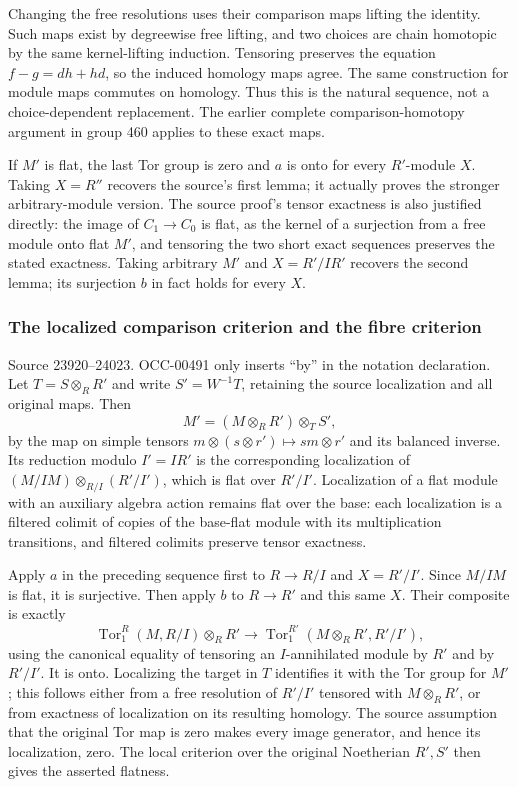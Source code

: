 Changing the free resolutions uses their comparison maps lifting the identity. Such maps exist by degreewise free lifting, and two choices are chain homotopic by the same kernel-lifting induction. Tensoring preserves the equation \(f-g=dh+hd\), so the induced homology maps agree. The same construction for module maps commutes on homology. Thus this is the natural sequence, not a choice-dependent replacement. The earlier complete comparison-homotopy argument in group 460 applies to these exact maps.

If \(M'\) is flat, the last Tor group is zero and \(a\) is onto for every \(R'\)-module \(X\). Taking \(X=R''\) recovers the source's first lemma; it actually proves the stronger arbitrary-module version. The source proof's tensor exactness is also justified directly: the image of \(C_1\to C_0\) is flat, as the kernel of a surjection from a free module onto flat \(M'\), and tensoring the two short exact sequences preserves the stated exactness. Taking arbitrary \(M'\) and \(X=R'/IR'\) recovers the second lemma; its surjection \(b\) in fact holds for every \(X\).

\subsubsection{The localized comparison criterion and the fibre criterion}\label{algebra-proof-016-the-localized-comparison-criterion-and-the-fibre-criterion}

Source 23920--24023. OCC-00491 only inserts ``by'' in the notation declaration. Let \(T=S\otimes_RR'\) and write \(S'=W^{-1}T\), retaining the source localization and all original maps. Then \[
M'=(M\otimes_RR')\otimes_T S',
\] by the map on simple tensors \(m\otimes(s\otimes r')\mapsto sm\otimes r'\) and its balanced inverse. Its reduction modulo \(I'=IR'\) is the corresponding localization of \((M/IM)\otimes_{R/I}(R'/I')\), which is flat over \(R'/I'\). Localization of a flat module with an auxiliary algebra action remains flat over the base: each localization is a filtered colimit of copies of the base-flat module with its multiplication transitions, and filtered colimits preserve tensor exactness.

Apply \(a\) in the preceding sequence first to \(R\to R/I\) and \(X=R'/I'\). Since \(M/IM\) is flat, it is surjective. Then apply \(b\) to \(R\to R'\) and this same \(X\). Their composite is exactly \[
\operatorname{Tor}_1^R(M,R/I)\otimes_R R'
 \longrightarrow \operatorname{Tor}_1^{R'}(M\otimes_RR',R'/I'),
\] using the canonical equality of tensoring an \(I\)-annihilated module by \(R'\) and by \(R'/I'\). It is onto. Localizing the target in \(T\) identifies it with the Tor group for \(M'\); this follows either from a free resolution of \(R'/I'\) tensored with \(M\otimes_RR'\), or from exactness of localization on its resulting homology. The source assumption that the original Tor map is zero makes every image generator, and hence its localization, zero. The local criterion over the original Noetherian \(R',S'\) then gives the asserted flatness.

